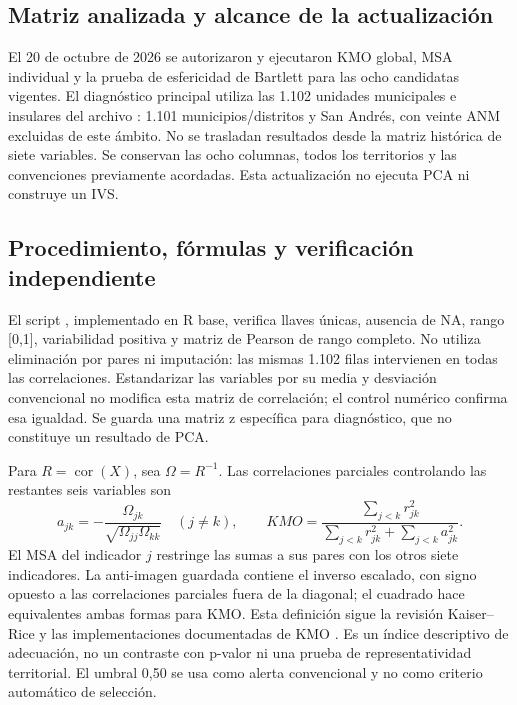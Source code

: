 \subsection{Matriz analizada y alcance de la actualización}

El 20 de octubre de 2026 se autorizaron y ejecutaron KMO global, MSA individual y la prueba de esfericidad de Bartlett para las ocho candidatas vigentes. El diagnóstico principal utiliza las 1.102 unidades municipales e insulares del archivo : 1.101 municipios/distritos y San Andrés, con veinte ANM excluidas de este ámbito. No se trasladan resultados desde la matriz histórica de siete variables. Se conservan las ocho columnas, todos los territorios y las convenciones previamente acordadas. Esta actualización no ejecuta PCA ni construye un IVS.

\subsection{Procedimiento, fórmulas y verificación independiente}

El script , implementado en R base, verifica llaves únicas, ausencia de NA, rango [0,1], variabilidad positiva y matriz de Pearson de rango completo. No utiliza eliminación por pares ni imputación: las mismas 1.102 filas intervienen en todas las correlaciones. Estandarizar las variables por su media y desviación convencional no modifica esta matriz de correlación; el control numérico confirma esa igualdad. Se guarda una matriz z específica para diagnóstico, que no constituye un resultado de PCA.

Para $R=\operatorname{cor}(X)$, sea $\Omega=R^{-1}$. Las correlaciones parciales controlando las restantes seis variables son
\[
a_{jk}=-\frac{\Omega_{jk}}{\sqrt{\Omega_{jj}\Omega_{kk}}}\quad(j\ne k),\qquad
KMO=\frac{\sum_{j<k}r_{jk}^2}{\sum_{j<k}r_{jk}^2+\sum_{j<k}a_{jk}^2}.
\]
El MSA del indicador $j$ restringe las sumas a sus pares con los otros siete indicadores. La anti-imagen guardada contiene el inverso escalado, con signo opuesto a las correlaciones parciales fuera de la diagonal; el cuadrado hace equivalentes ambas formas para KMO. Esta definición sigue la revisión Kaiser--Rice y las implementaciones documentadas de KMO \citep{kaiserRice1974,psychKMO2026}. Es un índice descriptivo de adecuación, no un contraste con p-valor ni una prueba de representatividad territorial. El umbral 0,50 se usa como alerta convencional y no como criterio automático de selección.

